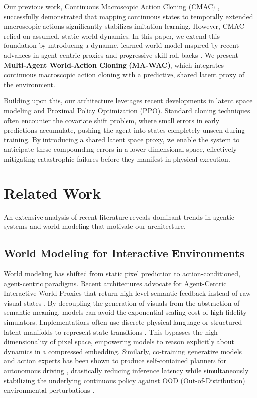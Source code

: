 \documentclass[conference]{IEEEtran}
\begin{document}
Our previous work, Continuous Macroscopic Action Cloning (CMAC) \cite{cmac}, successfully demonstrated that mapping continuous states to temporally extended macroscopic actions significantly stabilizes imitation learning. However, CMAC relied on assumed, static world dynamics. In this paper, we extend this foundation by introducing a dynamic, learned world model inspired by recent advances in agent-centric proxies \cite{quovadis, simwam} and progressive skill roll-backs \cite{skillalpha}. We present \textbf{Multi-Agent World-Action Cloning (MA-WAC)}, which integrates continuous macroscopic action cloning with a predictive, shared latent proxy of the environment.

Building upon this, our architecture leverages recent developments in latent space modeling and Proximal Policy Optimization (PPO). Standard cloning techniques often encounter the covariate shift problem, where small errors in early predictions accumulate, pushing the agent into states completely unseen during training. By introducing a shared latent space proxy, we enable the system to anticipate these compounding errors in a lower-dimensional space, effectively mitigating catastrophic failures before they manifest in physical execution.

\section{Related Work}\label{sec2}
An extensive analysis of recent literature reveals dominant trends in agentic systems and world modeling that motivate our architecture.

\subsection{World Modeling for Interactive Environments}
World modeling has shifted from static pixel prediction to action-conditioned, agent-centric paradigms. Recent architectures advocate for Agent-Centric Interactive World Proxies that return high-level semantic feedback instead of raw visual states \cite{quovadis, simwam, ref_1, ref_5, ref_8}. By decoupling the generation of visuals from the abstraction of semantic meaning, models can avoid the exponential scaling cost of high-fidelity simulators. Implementations often use discrete physical language or structured latent manifolds to represent state transitions \cite{ref_2, ref_10, ref_15}. This bypasses the high dimensionality of pixel space, empowering models to reason explicitly about dynamics in a compressed embedding. Similarly, co-training generative models and action experts has been shown to produce self-contained planners for autonomous driving \cite{simwam}, drastically reducing inference latency while simultaneously stabilizing the underlying continuous policy against OOD (Out-of-Distribution) environmental perturbations \cite{ref_12, ref_18}.
\end{document}
